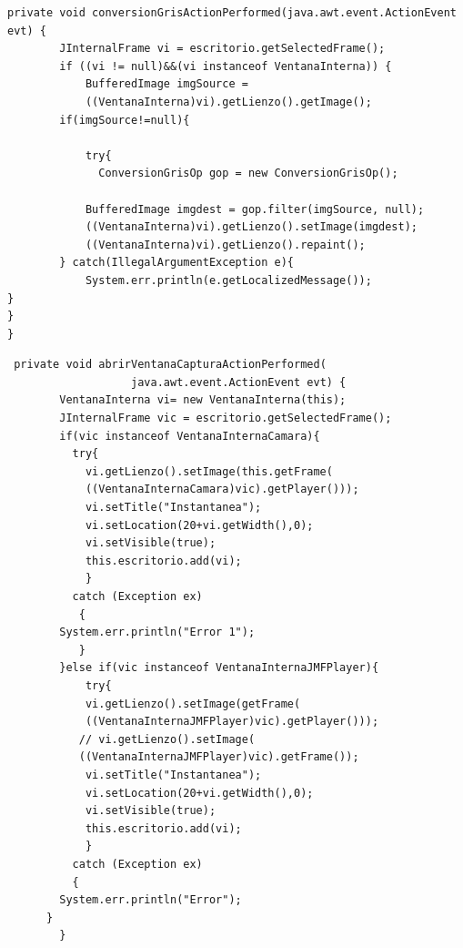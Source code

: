 \begin{lstlisting}
private void conversionGrisActionPerformed(java.awt.event.ActionEvent 
evt) {
        JInternalFrame vi = escritorio.getSelectedFrame();
        if ((vi != null)&&(vi instanceof VentanaInterna)) {
            BufferedImage imgSource = 
            ((VentanaInterna)vi).getLienzo().getImage();
        if(imgSource!=null){
           
            try{
              ConversionGrisOp gop = new ConversionGrisOp();
            
            BufferedImage imgdest = gop.filter(imgSource, null);
            ((VentanaInterna)vi).getLienzo().setImage(imgdest);
            ((VentanaInterna)vi).getLienzo().repaint();
        } catch(IllegalArgumentException e){
            System.err.println(e.getLocalizedMessage());
}
}
}
\end{lstlisting}
\begin{lstlisting}
 private void abrirVentanaCapturaActionPerformed(
                   java.awt.event.ActionEvent evt) {
        VentanaInterna vi= new VentanaInterna(this);
        JInternalFrame vic = escritorio.getSelectedFrame();
        if(vic instanceof VentanaInternaCamara){
          try{
            vi.getLienzo().setImage(this.getFrame(
            ((VentanaInternaCamara)vic).getPlayer()));
            vi.setTitle("Instantanea");
            vi.setLocation(20+vi.getWidth(),0);
            vi.setVisible(true);
            this.escritorio.add(vi);
            }
          catch (Exception ex)
           {
        System.err.println("Error 1");
           }
        }else if(vic instanceof VentanaInternaJMFPlayer){
            try{
            vi.getLienzo().setImage(getFrame(
            ((VentanaInternaJMFPlayer)vic).getPlayer()));
           // vi.getLienzo().setImage(
           ((VentanaInternaJMFPlayer)vic).getFrame());  
            vi.setTitle("Instantanea");
            vi.setLocation(20+vi.getWidth(),0);
            vi.setVisible(true);
            this.escritorio.add(vi);
            }
          catch (Exception ex)
          {
        System.err.println("Error");
      }
        }
    
\end{lstlisting}
